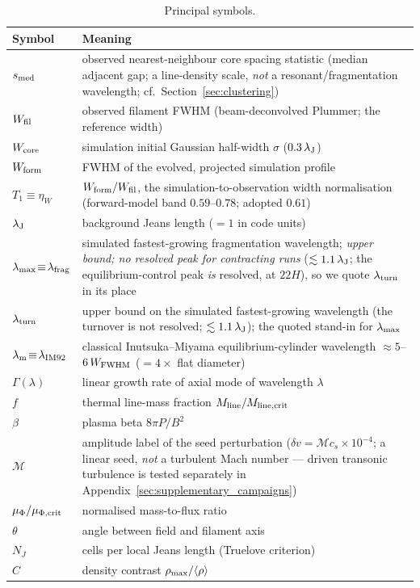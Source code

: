 \documentclass[usenatbib,twoside,twocolumn]{mnras}
\begin{document}
\begin{table}
\caption{Principal symbols.}
\label{tab:symbols}
\footnotesize
\setlength{\tabcolsep}{4pt}
\begin{tabular}{lp{6.1cm}}
\toprule
Symbol & Meaning \\
\midrule
$s_{\rm med}$ & observed nearest-neighbour core spacing statistic (median adjacent gap; a line-density scale, \emph{not} a resonant/fragmentation wavelength; cf.\ Section~\ref{sec:clustering}) \\
$W_{\rm fil}$ & observed filament FWHM (beam-deconvolved Plummer; the reference width) \\
$W_{\rm core}$ & simulation initial Gaussian half-width $\sigma$ ($0.3\,\lambda_{\rm J}$) \\
$W_{\rm form}$ & FWHM of the evolved, projected simulation profile \\
$T_1\!\equiv\!\eta_W$ & $W_{\rm form}/W_{\rm fil}$, the simulation-to-observation width normalisation (forward-model band $0.59$--$0.78$; adopted $0.61$) \\
$\lambda_{\rm J}$ & background Jeans length ($=1$ in code units) \\
$\lambda_{\rm max}\!\equiv\!\lambda_{\rm frag}$ & simulated fastest-growing fragmentation wavelength; \emph{upper bound; no resolved peak for contracting runs} ($\lesssim1.1\,\lambda_{\rm J}$; the equilibrium-control peak \emph{is} resolved, at $22H$), so we quote $\lambda_{\rm turn}$ in its place \\
$\lambda_{\rm turn}$ & upper bound on the simulated fastest-growing wavelength (the turnover is not resolved; $\lesssim1.1\,\lambda_{\rm J}$); the quoted stand-in for $\lambda_{\rm max}$ \\
$\lambda_{\rm m}\!\equiv\!\lambda_{\rm IM92}$ & classical Inutsuka--Miyama equilibrium-cylinder wavelength $\approx5$--$6\,W_{\rm FWHM}$ ($=4\times$ flat diameter) \\
$\Gamma(\lambda)$ & linear growth rate of axial mode of wavelength $\lambda$ \\
$f$ & thermal line-mass fraction $M_{\rm line}/M_{\rm line,crit}$ \\
$\beta$ & plasma beta $8\pi P/B^2$ \\
$\mathcal{M}$ & amplitude label of the seed perturbation ($\delta v=\mathcal{M}c_s\times10^{-4}$; a linear seed, \emph{not} a turbulent Mach number --- driven transonic turbulence is tested separately in Appendix~\ref{sec:supplementary_campaigns}) \\
$\mu_\Phi/\mu_{\Phi,\rm crit}$ & normalised mass-to-flux ratio \\
$\theta$ & angle between field and filament axis \\
$N_J$ & cells per local Jeans length (Truelove criterion) \\
$C$ & density contrast $\rho_{\rm max}/\langle\rho\rangle$ \\
\bottomrule
\end{tabular}
\end{table}
\end{document}
